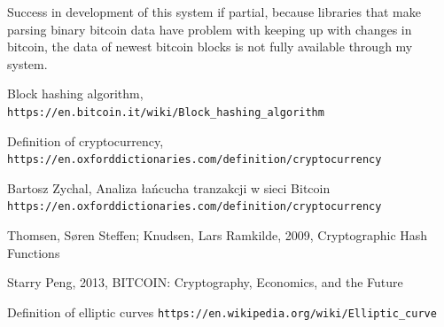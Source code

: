\documentclass[12pt, en, eng, oneside]{mgr}
\begin{document}
Success in development of this system if partial, because libraries that make parsing binary bitcoin data have problem with keeping up with changes in bitcoin, the data of newest bitcoin blocks is not fully available through my system.    
   

\begin{thebibliography}{9}
 
Block hashing algorithm,
\texttt{https://en.bitcoin.it/wiki/Block\_hashing\_algorithm}

Definition of cryptocurrency,
\texttt{https://en.oxforddictionaries.com/definition/cryptocurrency}

Bartosz Zychal, Analiza łańcucha tranzakcji w sieci Bitcoin
\texttt{https://en.oxforddictionaries.com/definition/cryptocurrency}

Thomsen, Søren Steffen; Knudsen, Lars Ramkilde, 2009, Cryptographic Hash Functions

Starry Peng, 2013, BITCOIN: Cryptography, Economics, and the Future

Definition of elliptic curves
\texttt{https://en.wikipedia.org/wiki/Elliptic\_curve}

\end{thebibliography}
\end{document}
